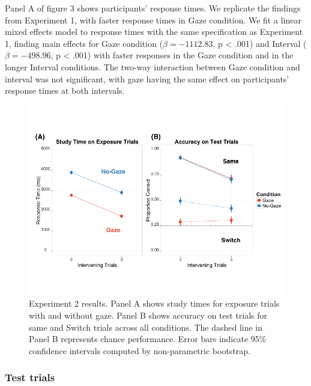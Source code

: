 \documentclass[a4paper,man,floatsintext]{apa6}
\newenvironment{CodeChunk}{}{}
\begin{document}
Panel A of figure 3 shows participants' response times. We replicate the
findings from Experiment 1, with faster response times in Gaze
condition. We fit a linear mixed effects model to response times with
the same specification as Experiment 1, finding main effects for Gaze
condition (\(\beta = -1112.83\), p \textless{} .001) and Interval
(\(\beta = -498.96\), p \textless{} .001) with faster responses in the
Gaze condition and in the longer Interval conditions. The two-way
interaction between Gaze condition and interval was not significant,
with gaze having the same effect on participants' response times at both
intervals.

\begin{CodeChunk}
\begin{figure}[!ht]
\includegraphics{figs/expt2-plot-1} \caption[Experiment 2 results]{Experiment 2 results. Panel A shows study times for exposure trials with and without gaze. Panel B shows accuracy on test trials for same and Switch trials across all conditions. The dashed line in Panel B represents chance performance. Error bars indicate 95\% confidence intervals computed by non-parametric bootstrap.}\label{fig:expt2-plot}
\end{figure}
\end{CodeChunk}

\subsubsection{Test trials}\label{test-trials-1}
\end{document}
